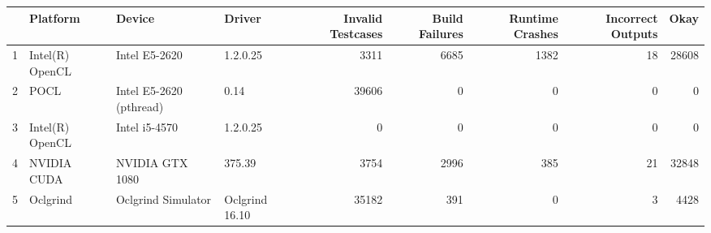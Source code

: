 \begin{tabular}{llllrrrrr}
\toprule
{} &         Platform &                   Device &          Driver &  Invalid Testcases &  Build Failures &  Runtime Crashes &  Incorrect Outputs &   Okay \\
\midrule
1 &  Intel(R) OpenCL &            Intel E5-2620 &        1.2.0.25 &               3311 &            6685 &             1382 &                 18 &  28608 \\
2 &             POCL &  Intel E5-2620 (pthread) &            0.14 &              39606 &               0 &                0 &                  0 &      0 \\
3 &  Intel(R) OpenCL &            Intel i5-4570 &        1.2.0.25 &                  0 &               0 &                0 &                  0 &      0 \\
4 &      NVIDIA CUDA &          NVIDIA GTX 1080 &          375.39 &               3754 &            2996 &              385 &                 21 &  32848 \\
5 &         Oclgrind &       Oclgrind Simulator &  Oclgrind 16.10 &              35182 &             391 &                0 &                  3 &   4428 \\
\bottomrule
\end{tabular}
